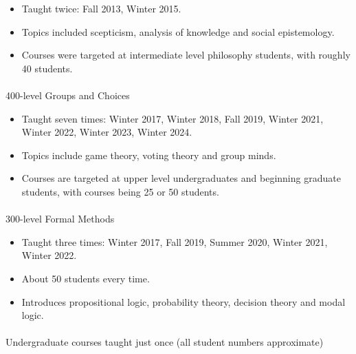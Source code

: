 \documentclass[
  10pt,
  letterpaper,
  DIV=11,
  numbers=noendperiod,
  twoside]{scrartcl}
\makeatletter
\let\oldparagraph\paragraph
\renewcommand{\paragraph}{
    \@ifstar
      \xxxParagraphStar
      \xxxParagraphNoStar
  }
\newcommand{\xxxParagraphStar}[1]{\oldparagraph*{#1}\mbox{}}
\newcommand{\xxxParagraphNoStar}[1]{\oldparagraph{#1}\mbox{}}
\providecommand{\tightlist}{%
  \setlength{\itemsep}{0pt}\setlength{\parskip}{0pt}}\usepackage{longtable,booktabs,array}
\makeatother
\begin{document}
\begin{itemize}
\tightlist
\item
  Taught twice: Fall 2013, Winter 2015.
\item
  Topics included scepticism, analysis of knowledge and social
  epistemology.
\item
  Courses were targeted at intermediate level philosophy students, with
  roughly 40 students.
\end{itemize}

\paragraph{400-level Groups and Choices}\label{level-groups-and-choices}

\begin{itemize}
\tightlist
\item
  Taught seven times: Winter 2017, Winter 2018, Fall 2019, Winter 2021,
  Winter 2022, Winter 2023, Winter 2024.
\item
  Topics include game theory, voting theory and group minds.
\item
  Courses are targeted at upper level undergraduates and beginning
  graduate students, with courses being 25 or 50 students.
\end{itemize}

\paragraph{300-level Formal Methods}\label{level-formal-methods}

\begin{itemize}
\tightlist
\item
  Taught three times: Winter 2017, Fall 2019, Summer 2020, Winter 2021,
  Winter 2022.
\item
  About 50 students every time.
\item
  Introduces propositional logic, probability theory, decision theory
  and modal logic.
\end{itemize}

\paragraph{Undergraduate courses taught just once (all student numbers
approximate)}\label{undergraduate-courses-taught-just-once-all-student-numbers-approximate}
\end{document}
